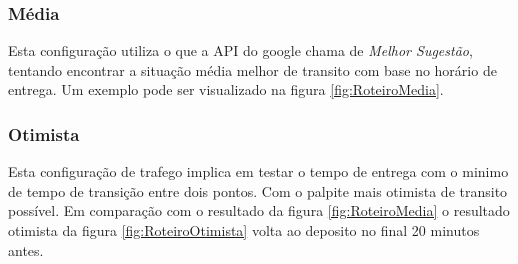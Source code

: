 \subsubsection{Média}

Esta configuração utiliza o que a API do google chama de \textit{Melhor Sugestão}, tentando encontrar a situação média melhor de transito com base no horário de entrega. 
Um exemplo pode ser visualizado na figura \ref{fig:RoteiroMedia}.

\begin{center}
	\label{fig:RoteiroMedia}
\end{center}
\subsubsection{Otimista}

Esta configuração de trafego implica em testar o tempo de entrega com o minimo de tempo de transição entre dois pontos. Com o palpite mais otimista de transito possível. 
Em comparação com o resultado da figura \ref{fig:RoteiroMedia} o resultado otimista da figura \ref{fig:RoteiroOtimista} volta ao deposito no final 20 minutos antes.

\begin{center}
	\label{fig:RoteiroOtimista}
\end{center}
